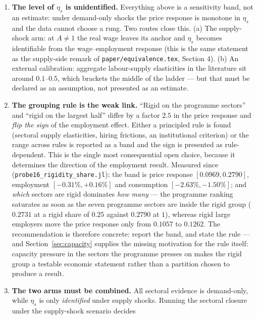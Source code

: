 \documentclass[11pt]{article}
\begin{document}
\begin{enumerate}
\item \textbf{The level of $\eta_{s}$ is unidentified.} Everything above is a
      sensitivity band, not an estimate: under demand-only shocks the price
      response is monotone in $\eta_s$ and the data cannot choose a rung. Two
      routes close this. (a) The supply-shock arm: at $A \neq 1$ the real wage
      leaves its anchor and $\eta_s$ becomes identifiable from the
      wage--employment response (this is the same statement as the
      supply-side remark of \texttt{paper/equivalence.tex}, Section 4). (b) An
      external
      calibration: aggregate labour-supply elasticities in the literature sit
      around $0.1$--$0.5$, which brackets the middle of the ladder --- but that
      must be declared as an assumption, not presented as an estimate.
\item \textbf{The grouping rule is the weak link.} ``Rigid on the programme
      sectors'' and ``rigid on the largest half'' differ by a factor $2.5$ in
      the price response and \emph{flip the sign} of the employment effect.
      Either a principled rule is found (sectoral supply elasticities, hiring
      frictions, an institutional criterion) or the range across rules is
      reported as a band and the sign is presented as rule-dependent. This is
      the single most consequential open choice, because it determines the
      direction of the employment result. Measured since
      (\texttt{probe16\_rigidity\_share.jl}): the band is price response
      $[0.0969, 0.2790]$, employment $[-0.31\%, +0.16\%]$ and consumption
      $[-2.63\%, -1.50\%]$; and \emph{which} sectors are rigid dominates
      \emph{how many} --- the programme ranking saturates as soon as the seven
      programme sectors are inside the rigid group ($0.2731$ at a rigid share of
      $0.25$ against $0.2790$ at $1$), whereas rigid large employers move the
      price response only from $0.1057$ to $0.1262$. The recommendation is
      therefore concrete: report the band, and state the rule --- and
      Section~\ref{sec:capacity} supplies the missing motivation for the rule
      itself: capacity pressure in the sectors the programme presses on makes
      the rigid group a testable economic statement rather than a partition
      chosen to produce a result.
\item \textbf{The two arms must be combined.} All sectoral evidence is
      demand-only, while $\eta_s$ is only \emph{identified} under supply shocks.
      Running the sectoral closure under the supply-shock scenario decides

\end{enumerate}
\end{document}
